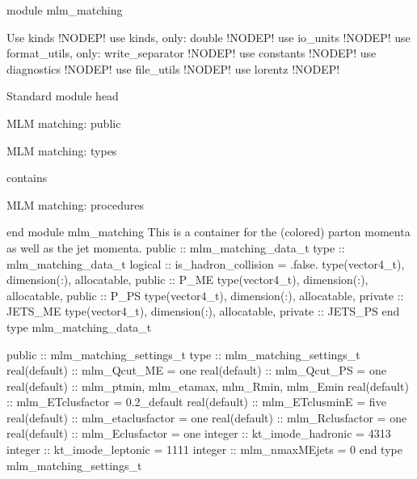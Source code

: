 module mlm_matching

\LA{}Use kinds\RA{} !NODEP!
  use kinds, only: double !NODEP!
  use io_units !NODEP!
  use format_utils, only: write_separator !NODEP!
  use constants !NODEP!
  use diagnostics !NODEP!
  use file_utils !NODEP!
  use lorentz !NODEP!

\LA{}Standard module head\RA{}

\LA{}MLM matching: public\RA{}

\LA{}MLM matching: types\RA{}

contains

\LA{}MLM matching: procedures\RA{}

end module mlm_matching
\eatline
\nwendcode{}This is a container for the (colored) parton momenta as well as the
jet momenta.
\nwenddocs{}\endmoddef
  public :: mlm_matching_data_t
\nwendcode{}\endmoddef
  type :: mlm_matching_data_t
     logical :: is_hadron_collision = .false.
     type(vector4_t), dimension(:), allocatable, public :: P_ME
     type(vector4_t), dimension(:), allocatable, public :: P_PS
     type(vector4_t), dimension(:), allocatable, private :: JETS_ME
     type(vector4_t), dimension(:), allocatable, private :: JETS_PS
  end type mlm_matching_data_t

\eatline
\nwendcode{}\nwdocspar
\nwenddocs{}\plusendmoddef
  public :: mlm_matching_settings_t
\nwendcode{}\plusendmoddef
  type :: mlm_matching_settings_t
     real(default) :: mlm_Qcut_ME = one
     real(default) :: mlm_Qcut_PS = one
     real(default) :: mlm_ptmin, mlm_etamax, mlm_Rmin, mlm_Emin
     real(default) :: mlm_ETclusfactor = 0.2_default
     real(default) :: mlm_ETclusminE = five
     real(default) :: mlm_etaclusfactor = one
     real(default) :: mlm_Rclusfactor = one
     real(default) :: mlm_Eclusfactor = one
     integer :: kt_imode_hadronic = 4313
     integer :: kt_imode_leptonic = 1111
     integer :: mlm_nmaxMEjets = 0
  end type mlm_matching_settings_t

